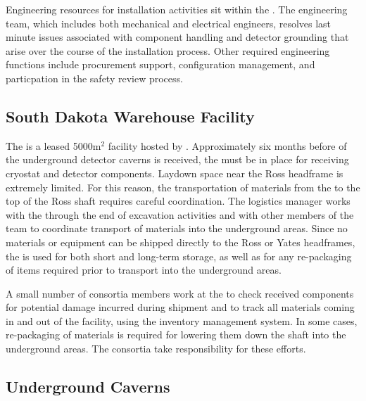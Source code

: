 Engineering resources for installation activities sit within the .  
The engineering team, which includes both mechanical and electrical 
engineers, resolves last minute issues associated with component 
handling and detector grounding that arise over the course of the 
installation process.  Other required engineering functions include 
procurement support, configuration management, and particpation in 
the safety review process.

\subsection{South Dakota Warehouse Facility}
\label{sec:sdwf}

The  is a leased 5000m$^2$ facility hosted by 
.  Approximately six months before 
of the underground detector caverns is received, the  
must be in place for receiving cryostat and detector 
components.  Laydown space near the Ross headframe is extremely 
limited.  For this reason, the transportation of materials from 
the  to the top of the Ross shaft requires careful 
coordination. The  logistics manager works 
with the  through the end of excavation activities  
and with other members of the  team to coordinate transport 
of materials into the underground areas.  Since no materials or 
equipment can be shipped directly to the Ross or Yates headframes, 
the  is used for both short and long-term storage, as 
well as for any re-packaging of items required prior to transport 
into the underground areas. 

A small number of  consortia members work at the
 to check received components for potential damage
incurred during shipment and to track all materials coming in and out of
the facility, using the inventory management system.  In some cases,
re-packaging of materials is required for lowering them down the shaft
into the underground areas.  The  consortia take
responsibility for these efforts.

\subsection{Underground Caverns}

